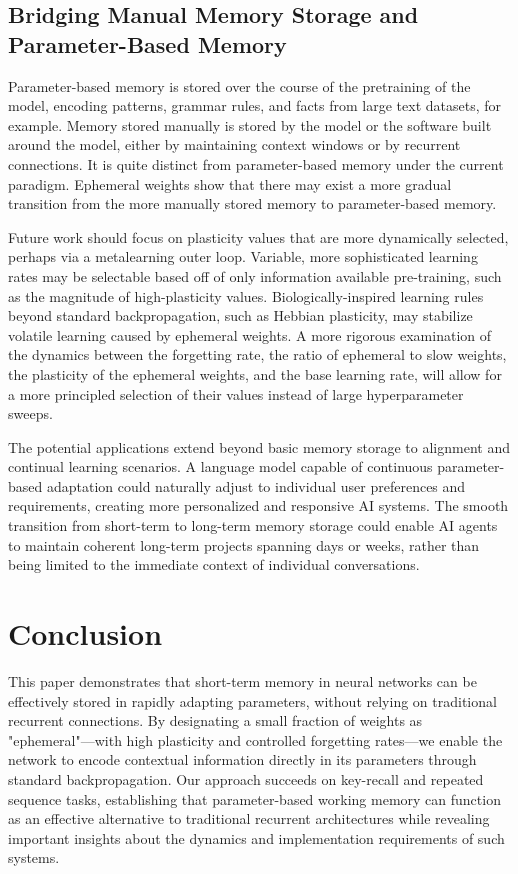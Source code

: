 \documentclass{article} %
\begin{document}
\subsection{Bridging Manual Memory Storage and Parameter-Based Memory}

Parameter-based memory is stored over the course of the pretraining of the model, encoding patterns, grammar rules, and facts from large text datasets, for example. Memory stored manually is stored by the model or the software built around the model, either by maintaining context windows or by recurrent connections. It is quite distinct from parameter-based memory under the current paradigm. Ephemeral weights show that there may exist a more gradual transition from the more manually stored memory to parameter-based memory. 

Future work should focus on plasticity values that are more dynamically selected, perhaps via a metalearning outer loop. Variable, more sophisticated learning rates may be selectable based off of only information available pre-training, such as the magnitude of high-plasticity values. Biologically-inspired learning rules beyond standard backpropagation, such as Hebbian plasticity, may stabilize volatile learning caused by ephemeral weights. A more rigorous examination of the dynamics between the forgetting rate, the ratio of ephemeral to slow weights, the plasticity of the ephemeral weights, and the base learning rate, will allow for a more principled selection of their values instead of large hyperparameter sweeps.

The potential applications extend beyond basic memory storage to alignment and continual learning scenarios. A language model capable of continuous parameter-based adaptation could naturally adjust to individual user preferences and requirements, creating more personalized and responsive AI systems. The smooth transition from short-term to long-term memory storage could enable AI agents to maintain coherent long-term projects spanning days or weeks, rather than being limited to the immediate context of individual conversations.

\section{Conclusion}

This paper demonstrates that short-term memory in neural networks can be effectively stored in rapidly adapting parameters, without relying on traditional recurrent connections. By designating a small fraction of weights as "ephemeral"—with high plasticity and controlled forgetting rates—we enable the network to encode contextual information directly in its parameters through standard backpropagation. Our approach succeeds on key-recall and repeated sequence tasks, establishing that parameter-based working memory can function as an effective alternative to traditional recurrent architectures while revealing important insights about the dynamics and implementation requirements of such systems.
\end{document}
